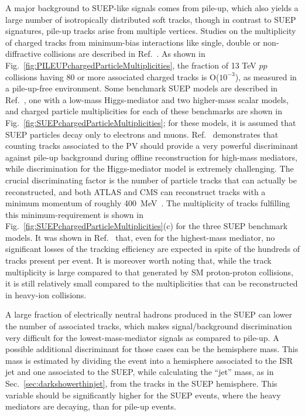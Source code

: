\begin{enumerate}
A major background to SUEP-like signals comes from pile-up, which also yields a large number of isotropically distributed soft tracks, though in contrast to SUEP signatures, pile-up tracks arise from multiple vertices. Studies on the multiplicity of charged tracks from minimum-bias interactions like single, double or non-diffractive collisions are described in Ref.~\cite{Aad:2016mok}. As shown in Fig.~\ref{fig:PILEUPchargedParticleMultiplicities}, the fraction of  13 TeV $pp$ collisions having 80 or more associated charged tracks is O($10^{-3}$), as measured in a pile-up-free environment.  Some benchmark SUEP models are described in Ref.~\cite{Knapen:2016hky}, one with a low-mass Higgs-mediator and two higher-mass scalar models, and charged particle multiplicities for each of these benchmarks are shown in Fig.~\ref{fig:SUEPchargedParticleMultiplicities}; for these models, it is assumed that SUEP particles decay only  to electrons and muons. Ref.~\cite{Knapen:2016hky} demonstrates that counting tracks associated to the PV should provide a very powerful discriminant against pile-up background during offline reconstruction for high-mass mediators, while discrimination for the Higgs-mediator model is extremely challenging. The crucial discriminating factor is the number of particle tracks that can actually be reconstructed, and both ATLAS and CMS can reconstruct tracks with a minimum momentum of roughly 400~MeV~\cite{Sirunyan:2017ulk}. The multiplicity of tracks fulfilling this minimum-\pt requirement is shown in Fig.~\ref{fig:SUEPchargedParticleMultiplicities}(c) for the three SUEP benchmark models. It was shown in Ref.~\cite{Knapen:2016hky} that, even for the highest-mass mediator, no significant losses of the tracking efficiency are expected in spite of the hundreds of tracks present per event. It is moreover worth noting that, while the track multiplicity is large compared to that generated by SM proton-proton collisions, it is still relatively small compared to the multiplicities that can be reconstructed in heavy-ion collisions. 

A large fraction of electrically neutral hadrons produced in the SUEP can lower the number of associated tracks, which makes signal/background discrimination very difficult for the lowest-mass-mediator signals as compared to pile-up. A possible additional discriminant for those cases can be the hemisphere mass. This mass is estimated by dividing the event into a hemisphere associated to the ISR jet and one associated to the SUEP, while calculating the ``jet'' mass, as in Sec.~\ref{sec:darkshowerthinjet}, from the tracks in the SUEP hemisphere. This variable should be significantly higher for the SUEP events, where the heavy mediators are decaying, than for pile-up events.


\end{enumerate}
